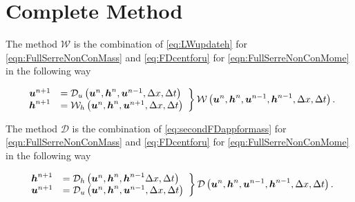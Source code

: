 \section{Complete Method}
The method $\mathcal{W}$ is the combination of \eqref{eq:LWupdateh} for \eqref{eqn:FullSerreNonConMass} and \eqref{eq:FDcentforu} for \eqref{eqn:FullSerreNonConMome} in the following way

	\begin{equation}
	\left.
	\begin{array}{l l}
	\boldsymbol{u}^{n+1}&=\mathcal{D}_u\left(\boldsymbol{u}^n,\boldsymbol{h}^n, \boldsymbol{u}^{n-1}, \Delta x, \Delta t \right) \\
	\boldsymbol{h}^{n+1}&=\mathcal{W}_h\left(\boldsymbol{u}^n,\boldsymbol{h}^n,\boldsymbol{u}^{n+1}, \Delta x, \Delta t \right)
	\end{array} \right\rbrace \mathcal{W}\left(\boldsymbol{u}^n,\boldsymbol{h}^n, \boldsymbol{u}^{n-1},\boldsymbol{h}^{n-1}, \Delta x, \Delta t \right).	 
	\label{eq:Wnumdef}
	\end{equation}


The method $\mathcal{D}$ is the combination of \eqref{eq:secondFDappformass} for \eqref{eqn:FullSerreNonConMass} and \eqref{eq:FDcentforu} for \eqref{eqn:FullSerreNonConMome} in the following way

	\begin{equation}
	\left.
	\begin{array}{l l}
	\boldsymbol{h}^{n+1}&=\mathcal{D}_h\left(\boldsymbol{u}^n,\boldsymbol{h}^n,\boldsymbol{h}^{n-1} \Delta x, \Delta t \right) \\
	\boldsymbol{u}^{n+1}&=\mathcal{D}_u\left(\boldsymbol{u}^n,\boldsymbol{h}^n, \boldsymbol{u}^{n-1}, \Delta x, \Delta t \right)
	\end{array} \right\rbrace \mathcal{D}\left(\boldsymbol{u}^n,\boldsymbol{h}^n, \boldsymbol{u}^{n-1},\boldsymbol{h}^{n-1}, \Delta x, \Delta t \right).
	\label{eq:Dnumdef}
	\end{equation}


